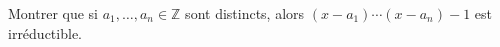 Montrer que si $a_1, \ldots, a_n \in \mathbb{Z}$ sont distincts, alors $(x - a_1) \cdots (x - a_n) - 1$ est irréductible.
